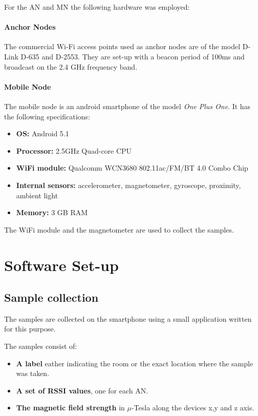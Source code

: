 For the AN and MN the following hardware was employed:

\paragraph{Anchor Nodes}
The commercial Wi-Fi access points used as anchor nodes are of the model D-Link D-635 and D-2553. They are set-up with a beacon period of 100ms and broadcast on the 2.4 GHz frequency band.

\paragraph{Mobile Node}

The mobile node is an android smartphone of the model \emph{One Plus One}. It has the following specifications:

\begin{itemize}
\item \textbf{OS:} Android 5.1
\item \textbf{Processor:} 2.5GHz Quad-core CPU
\item \textbf{WiFi module:} Qualcomm WCN3680 802.11ac/FM/BT 4.0 Combo Chip 
\item \textbf{Internal sensors:} accelerometer, magnetometer, gyroscope, proximity, ambient light
\item \textbf{Memory:} 3 GB RAM
\end{itemize}

The WiFi module and the magnetometer are used to collect the samples.


\section{Software Set-up}

\subsection{Sample collection}

The samples are collected on the smartphone using a small application written for this purpose.

The samples consist of:
\begin{itemize}
\item \textbf{A label} eather indicating the room or the exact location where the sample was taken.
\item \textbf{A set of RSSI values}, one for each AN.
\item \textbf{The magnetic field strength} in \(\mu\)-Tesla along the devices x,y and z axis.
\end{itemize}

